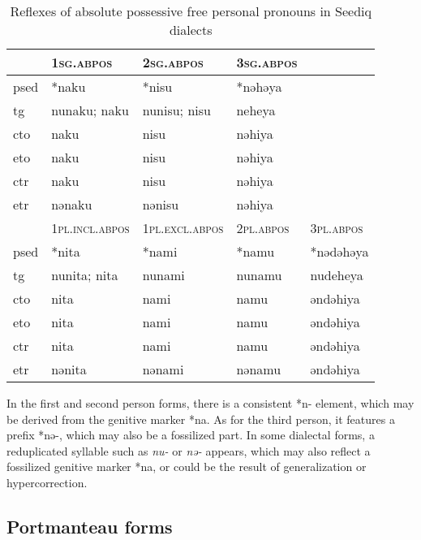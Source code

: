 \begin{table}[!htbp]
\centering
\caption{Reflexes of absolute possessive free personal pronouns in Seediq dialects}
\label{tab:possfree}
\begin{tabular}{lllll}
\hline
      & \textsc{1sg.abpos}      & \textsc{2sg.abpos}      & \textsc{3sg.abpos} &           \\ \hline
\acs{psed} & *naku       & *nisu       & *nəhəya &           \\
\acs{tg}  & nunaku; naku      & nunisu; nisu      & neheya     &           \\
\acs{cto}  & naku        & nisu       & nəhiya  &           \\
\acs{eto}  & naku        & nisu       & nəhiya  &           \\
\acs{ctr} & naku        & nisu        & nəhiya  &           \\
\acs{etr} & nənaku        & nənisu        & nəhiya  &           \\ \hline
      & \textsc{1pl.incl.abpos} & \textsc{1pl.excl.abpos} & \textsc{2pl.abpos} & \textsc{3pl.abpos}   \\ \hline
\acs{psed} & *nita       & *nami       & *namu  & *nədəhəya \\
\acs{tg}  & nunita; nita     & nunami          & nunamu & nudeheya       \\
\acs{cto}  & nita        & nami        & namu   & əndəhiya  \\
\acs{eto}  & nita        & nami        & namu   & əndəhiya  \\
\acs{ctr} & nita        & nami        & namu   & əndəhiya  \\
\acs{etr} & nənita        & nənami        & nənamu   & əndəhiya  \\ \hline
\end{tabular}
\end{table}

In the first and second person forms, there is a consistent *n- element, which may be derived from the genitive marker *na. As for the third person, it features a prefix *nə-, which may also be a fossilized part. In some dialectal forms, a reduplicated syllable such as \textit{nu-} or \textit{nə-} appears, which may also reflect a fossilized genitive marker *na, or could be the result of generalization or hypercorrection.

\subsection{Portmanteau forms}

